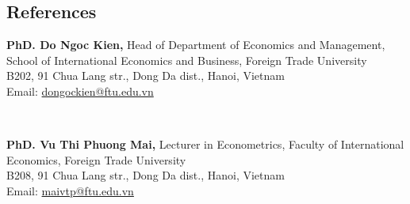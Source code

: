 \documentclass[margin,line]{res}
\begin{document}
\begin{resume}
\vspace{4mm}







\section{\sc References}
\vspace*{.05in}

\par
\parbox{\textwidth}{
{\bf PhD. Do Ngoc Kien,} Head of Department of Economics and Management, School of International Economics and Business, Foreign Trade University \\
B202, 91 Chua Lang str., Dong Da dist., Hanoi, Vietnam \\
Email: \href{mailto:dongockien@ftu.edu.vn}{dongockien@ftu.edu.vn}} \\

\par
\parbox{\textwidth}{
{\bf PhD. Vu Thi Phuong Mai,} Lecturer in Econometrics, Faculty of International Economics, Foreign Trade University\\
B208, 91 Chua Lang str., Dong Da dist., Hanoi, Vietnam \\
Email: \href{mailto:maivtp@ftu.edu.vn}{maivtp@ftu.edu.vn}}



\end{resume}
\end{document}
